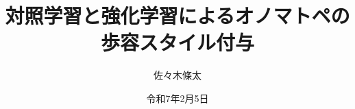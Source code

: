 \documentclass[a4paper,12pt,uplatex]{jsreport}
\title{対照学習と強化学習によるオノマトペの歩容スタイル付与}
\affiliation{大阪大学基礎工学部システム科学科知能システム学コース}
\author{佐々木條太}
\date{令和7年2月5日}
\begin{document}
\maketitle       %
\tableofcontents %
\thispagestyle{empty}
\listoffigures %
\thispagestyle{empty}
\listoftables %
\thispagestyle{empty}
\newpage

\setcounter{page}{1}			%
\def\thepage{\arabic{page}}     %
\pagestyle{fancy}
\renewcommand{\chaptermark}[1]{\markboth{第\ \thechapter\ 章 #1}{}} 
\renewcommand{\sectionmark}[1]{\markright{\thesection.\ #1}}


\end{document}
